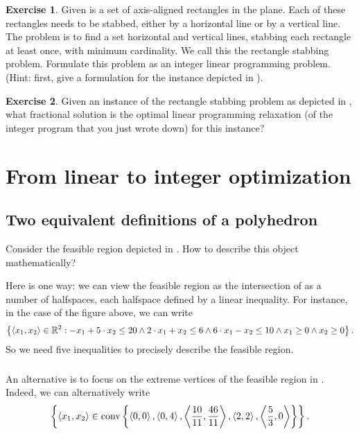 \documentclass[titlepage]{book}
\theoremstyle{plain}
\theoremstyle{definition}
\newtheorem{exercise}{Exercise}[chapter]
\theoremstyle{remark}
\begin{document}
\begin{exercise}
Given is a set of axis-aligned rectangles in the plane. Each of these rectangles needs to be stabbed, either by a horizontal line or by a vertical line. The problem is to find a set horizontal and vertical lines, stabbing each rectangle at least once, with minimum cardinality. We call this the rectangle stabbing problem. Formulate this problem as an integer linear programming problem. (Hint: first, give a formulation for the instance depicted in ).
\end{exercise}
\begin{exercise}
Given an instance of the rectangle stabbing problem as depicted in , what fractional solution is the optimal linear programming relaxation (of the integer program that you just wrote down) for this instance?
\end{exercise}


\chapter{From linear to integer optimization}

\section{Two equivalent definitions of a polyhedron}

Consider the feasible region depicted in . How to describe this object mathematically?


Here is one way: we can view the feasible region as the intersection of as a number of halfspaces, each halfspace defined by a linear inequality. For instance, in the case of the figure above, we can write
\begin{equation}
\left\{ \left\langle x_1,x_2 \right\rangle\in\mathbb{R}^2: -x_1+5\cdot x_2\leq 20 \wedge 2\cdot x_1+x_2\leq 6\wedge 6\cdot x_1-x_2\leq 10\wedge x_1\geq 0\wedge x_2\geq 0 \right\}.
\end{equation}
So we need five inequalities to precisely describe the feasible region.

\paragraph{}
An alternative is to focus on the extreme vertices of the feasible region in . Indeed, we can alternatively write
\begin{equation}
\left\{ \left\langle x_1,x_2 \right\rangle\in\mbox{conv}\left\{ \left\langle 0,0 \right\rangle,\left\langle 0,4 \right\rangle,\left\langle \frac{10}{11},\frac{46}{11} \right\rangle,\left\langle 2,2 \right\rangle,\left\langle \frac{5}{3},0 \right\rangle \right\} \right\}.
\end{equation}
\end{document}
